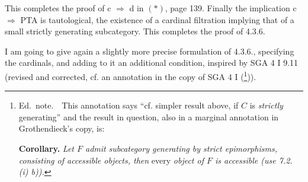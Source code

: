 This completes the proof of c $\Longrightarrow$ d in $(*)$, page 139. Finally the implication c $\Longrightarrow$ PTA is tautological, the existence of a cardinal filtration implying that of a small strictly generating subcategory. This completes the proof of 4.3.6.

I am going to give again a slightly more precise formulation of 4.3.6., specifying the cardinals, and adding to it an additional condition, inspired by SGA 4 I 9.11 (revised and corrected, cf. an annotation in the copy of SGA 4 I (\footnote[58]{Ed.~note.\ \ This annotation says ``cf. simpler result above, if $C$ is \textit{strictly} generating'' and
the result in question, also in a marginal annotation in Grothendieck's copy, is:\par
\textbf{Corollary.} \textit{Let $F$ admit} \textit{subcategory generating by strict epimorphisms, consisting of accessible objects, then} every \textit{object of $F$ is accessible (use 7.2. (i) b)).}})).


